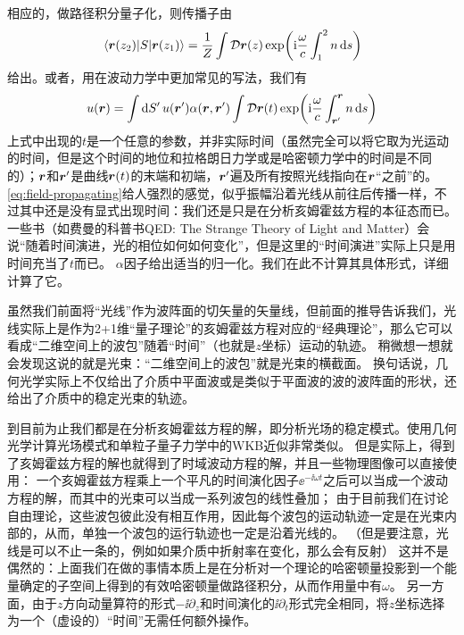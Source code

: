 相应的，做路径积分量子化，则传播子由
\begin{equation}
    \mel{\vb*{r}(z_2)}{S}{\vb*{r}(z_1)} = \frac{1}{Z} \int \mathcal{D} {\vb*{r}(z)} \exp(\mathrm{i} \frac{\omega}{c} \int_1^2 n \dd{s})
\end{equation}
给出。或者，用在波动力学中更加常见的写法，我们有
\begin{equation}
    u(\vb*{r}) = \int \dd{S'} u(\vb*{r}') \alpha(\vb*{r}, \vb*{r}') \int \mathcal{D} {\vb*{r}(t)} \exp(\mathrm{i} \frac{\omega}{c} \int_{\vb*{r}'}^{\vb*{r}} n \dd{s})
    \label{eq:field-propagating}
\end{equation}
上式中出现的$t$是一个任意的参数，并非实际时间（虽然完全可以将它取为光运动的时间，但是这个时间的地位和拉格朗日力学或是哈密顿力学中的时间是不同的）；$\vb*{r}$和$\vb*{r}'$是曲线$\vb*{r}(t)$的末端和初端，$\vb*{r}'$遍及所有按照光线指向在$\vb*{r}$“之前”的。
\eqref{eq:field-propagating}给人强烈的感觉，似乎振幅沿着光线从前往后传播一样，不过其中还是没有显式出现时间：我们还是只是在分析亥姆霍兹方程的本征态而已。
一些书（如费曼的科普书QED: The Strange Theory of Light and Matter）会说“随着时间演进，光的相位如何如何变化”，但是这里的“时间演进”实际上只是用时间充当了$t$而已。
$\alpha$因子给出适当的归一化。我们在此不计算其具体形式，\cite{Gitin_2013}详细计算了它。

虽然我们前面将“光线”作为波阵面的切矢量的矢量线，但前面的推导告诉我们，光线实际上是作为2+1维“量子理论”的亥姆霍兹方程对应的“经典理论”，那么它可以看成“二维空间上的波包”随着“时间”（也就是$z$坐标）运动的轨迹。
稍微想一想就会发现这说的就是光束：“二维空间上的波包”就是光束的横截面。
换句话说，几何光学实际上不仅给出了介质中平面波或是类似于平面波的波的波阵面的形状，还给出了介质中的稳定光束的轨迹。

到目前为止我们都是在分析亥姆霍兹方程的解，即分析光场的稳定模式。使用几何光学计算光场模式和单粒子量子力学中的WKB近似非常类似。
但是实际上，得到了亥姆霍兹方程的解也就得到了时域波动方程的解，并且一些物理图像可以直接使用：
一个亥姆霍兹方程乘上一个平凡的时间演化因子$\ee^{-\ii \omega t}$之后可以当成一个波动方程的解，而其中的光束可以当成一系列波包的线性叠加；
由于目前我们在讨论自由理论，这些波包彼此没有相互作用，因此每个波包的运动轨迹一定是在光束内部的，从而，单独一个波包的运行轨迹也一定是沿着光线的。
（但是要注意，光线是可以不止一条的，例如如果介质中折射率在变化，那么会有反射）
这并不是偶然的：上面我们在做的事情本质上是在分析对一个理论的哈密顿量投影到一个能量确定的子空间上得到的有效哈密顿量做路径积分，从而作用量中有$\omega$。
另一方面，由于$z$方向动量算符的形式$- \ii \partial_z$和时间演化的$\ii \partial_t$形式完全相同，将$z$坐标选择为一个（虚设的）“时间”无需任何额外操作。

